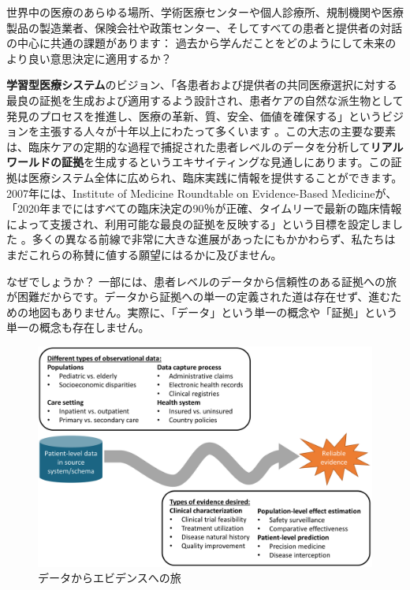 \documentclass[
  11pt]{book}
\theoremstyle{definition}
\theoremstyle{definition}
\theoremstyle{definition}
\theoremstyle{definition}
\theoremstyle{remark}
\begin{document}
世界中の医療のあらゆる場所、学術医療センターや個人診療所、規制機関や医療製品の製造業者、保険会社や政策センター、そしてすべての患者と提供者の対話の中心に共通の課題があります： 過去から学んだことをどのようにして未来のより良い意思決定に適用するか？

\textbf{学習型医療システム}のビジョン、「各患者および提供者の共同医療選択に対する最良の証拠を生成および適用するよう設計され、患者ケアの自然な派生物として発見のプロセスを推進し、医療の革新、質、安全、価値を確保する」というビジョンを主張する人々が十年以上にわたって多くいます \citep{olsen2007learning}。この大志の主要な要素は、臨床ケアの定期的な過程で捕捉された患者レベルのデータを分析して\textbf{リアルワールドの証拠}を生成するというエキサイティングな見通しにあります。この証拠は医療システム全体に広められ、臨床実践に情報を提供することができます。2007年には、Institute of Medicine Roundtable on Evidence-Based Medicineが、「2020年までにはすべての臨床決定の90％が正確、タイムリーで最新の臨床情報によって支援され、利用可能な最良の証拠を反映する」という目標を設定しました \citep{olsen2007learning}。多くの異なる前線で非常に大きな進展があったにもかかわらず、私たちはまだこれらの称賛に値する願望にはるかに及びません。

なぜでしょうか？ 一部には、患者レベルのデータから信頼性のある証拠への旅が困難だからです。データから証拠への単一の定義された道は存在せず、進むための地図もありません。実際に、「データ」という単一の概念や「証拠」という単一の概念も存在しません。

\begin{figure}

{\centering \includegraphics[width=1\linewidth]{images/OhdsiCommunity/datajourney} 

}

\caption{データからエビデンスへの旅}\label{fig:datajourney}
\end{figure}
\end{document}
